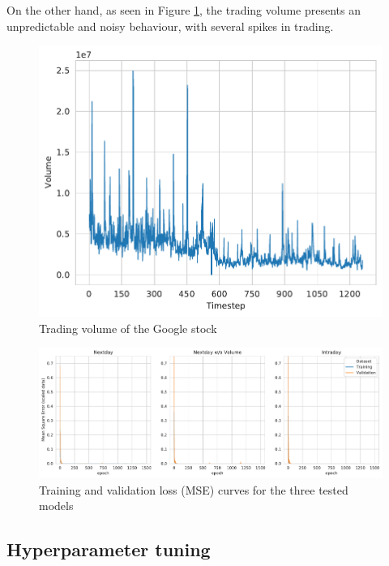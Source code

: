 \documentclass[10pt,twocolumn,letterpaper]{article}
\begin{document}
On the other hand, as seen in Figure \ref{fig:volume}, the trading volume presents an unpredictable and noisy behaviour, with several spikes in trading.

\begin{figure}[h]
	\begin{center}
		\includegraphics[width=1.0\linewidth]{volume.pdf}
	\end{center}
	\caption{Trading volume of the Google stock}
	\label{fig:volume}
\end{figure}

\begin{figure}[h]
	\begin{center}
		\includegraphics[width=1\linewidth]{train_val_loss.pdf}
		\caption{Training and validation loss (MSE) curves for the three tested models}
		\label{fig:loss}
	\end{center}
\end{figure}

\subsection{Hyperparameter tuning}
\end{document}
